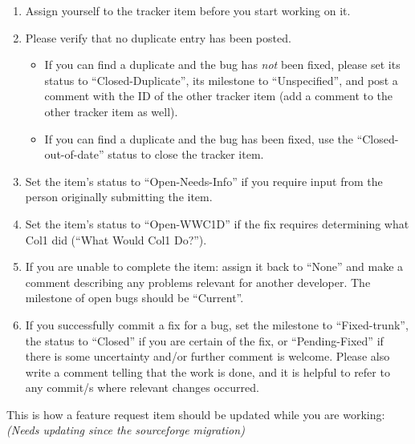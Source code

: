 \documentclass[12pt]{book}
\begin{document}
\begin{enumerate}
\item Assign yourself to the tracker item before you start working on it.

\item Please verify that no duplicate entry has been posted.

\begin{itemize}
\item If you can find a duplicate and the bug has \emph{not} been
  fixed, please set its status to ``Closed-Duplicate'', its milestone
  to ``Unspecified'', and post a comment with the ID of the other
  tracker item (add a comment to the other tracker item as well).

\item If you can find a duplicate and the bug has been fixed, use the
  ``Closed-out-of-date'' status to close the tracker item.
\end{itemize}

\item Set the item's status to ``Open-Needs-Info'' if you require
  input from the person originally submitting the item.

\item Set the item's status to ``Open-WWC1D'' if the fix requires
  determining what Col1 did (``What Would Col1 Do?'').

\item If you are unable to complete the item: assign it back to
  ``None'' and make a comment describing any problems relevant for
  another developer. The milestone of open bugs should be ``Current''.

\item If you successfully commit a fix for a bug, set the milestone to
  ``Fixed-trunk'', the status to ``Closed'' if you are certain of the
  fix, or ``Pending-Fixed'' if there is some uncertainty and/or
  further comment is welcome. Please also write a comment telling
  that the work is done, and it is helpful to refer to any commit/s
  where relevant changes occurred.
\end{enumerate}


This is how a feature request item should be updated while you are
working:\emph{(Needs updating since the sourceforge migration)}
\end{document}
